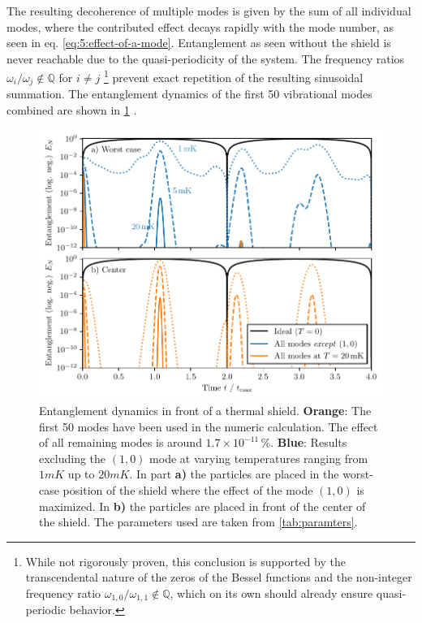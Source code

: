 The resulting decoherence of multiple modes is given by the sum of all individual modes, where the contributed effect decays rapidly with the mode number, as seen in eq. \eqref{eq:5:effect-of-a-mode}.
Entanglement as seen without the shield is never reachable due to the quasi-periodicity of the system. The frequency ratios $\omega_i/\omega_j \notin \mathbb{Q}$ for $i\neq j$ \footnote{While not rigorously proven, this conclusion is supported by the transcendental nature of the zeros of the Bessel functions \cite{Lorch_1995} and the non-integer frequency ratio $\omega_{1,0} / \omega_{1,1} \notin \mathbb{Q}$, which on its own should already ensure quasi-periodic behavior.} prevent exact repetition of the resulting sinusoidal summation.
The entanglement dynamics of the first 50 vibrational modes combined are shown in \cref{fig:5:entanglement-multiple-modes} .
\begin{figure}[!htbp]
  \centering
  \includegraphics[width=\textwidth]{./../figures/vibrations/entanglement-dynamics-all-modes.pdf}
  \caption{Entanglement dynamics in front of a thermal shield. \textbf{Orange}: The first 50 modes have been used in the numeric calculation. The effect of all remaining modes is around $1.7 \times 10^{-11}\,\%$. \textbf{Blue}: Results excluding the $(1,0)$ mode at varying temperatures ranging from $1\si{mK}$ up to $20\si{mK}$. In part \textbf{a)} the particles are placed in the worst-case position of the shield where the effect of the mode $(1,0)$ is maximized. In \textbf{b)} the particles are placed in front of the center of the shield. The parameters used are taken from \cref{tab:paramters}.}
  \label{fig:5:entanglement-multiple-modes}
\end{figure}
